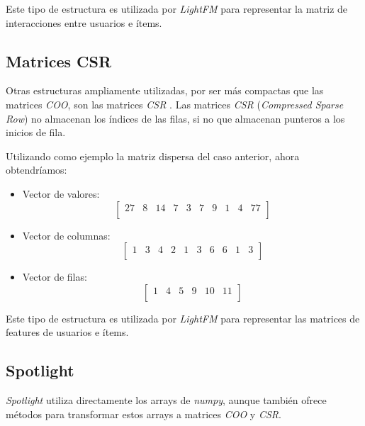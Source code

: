 Este tipo de estructura es utilizada por \textit{LightFM} para representar la matriz de interacciones entre usuarios e ítems.

\subsection{Matrices CSR}\label{matrices-csr}
Otras estructuras ampliamente utilizadas, por ser más compactas que las matrices \textit{COO}, son las matrices \textit{CSR} \cite{csr-matrix}. Las matrices \textit{CSR} (\textit{Compressed Sparse Row}) no almacenan los índices de las filas, si no que almacenan punteros a los inicios de fila.

Utilizando como ejemplo la matriz dispersa del caso anterior, ahora obtendríamos:
\begin{itemize}
\tightlist
\item Vector de valores: \[\begin{bmatrix} 27&8&14&7&3&7&9&1&4&77\\\end{bmatrix}\]
\item Vector de columnas: \[\begin{bmatrix} 1&3&4&2&1&3&6&6&1&3\\
\end{bmatrix}\]
\item Vector de filas: \[\begin{bmatrix} 1&4&5&9&10&11\\\end{bmatrix}\]
\end{itemize}

Este tipo de estructura es utilizada por \textit{LightFM} para representar las matrices de features de usuarios e ítems.

\subsection{Spotlight}\label{spotlight}
\textit{Spotlight} utiliza directamente los arrays de \textit{numpy}, aunque también ofrece métodos para transformar estos arrays a matrices \textit{COO} y \textit{CSR}.


